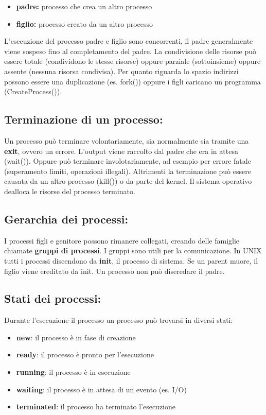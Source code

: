 \documentclass{article}
\begin{document}
\begin{itemize}
    \item \textbf{padre:} processo che crea un altro processo
    \item \textbf{figlio:} processo creato da un altro processo
\end{itemize}

L'esecuzione del processo padre e figlio sono concorrenti, il padre generalmente viene sospeso fino al completamento del padre. La 
condivisione delle risorse può essere totale (condividono le stesse risorse) oppure parziale (sottoinsieme) oppure assente (nessuna risorsa condivisa). Per quanto riguarda lo 
spazio indirizzi possono essere una duplicazione (es. fork()) oppure i figli caricano un programma (CreateProcess()).

\subsection{Terminazione di un processo:}
Un processo può terminare volontariamente, sia normalmente sia tramite una \textbf{exit}, ovvero un errore. L'output viene 
raccolto dal padre che era in attesa (wait()).
Oppure può terminare involotariamente, ad esempio per errore fatale (superamento limiti, operazioni illegali).
Altrimenti la terminazione può essere causata da un altro processo (kill()) o da parte del kernel. Il sistema operativo 
dealloca le risorse del processo terminato.

\subsection{Gerarchia dei processi:}
I processi figli e genitore possono rimanere collegati, creando delle famiglie chiamate \textbf{gruppi di processi}. I gruppi 
sono utili per la comunicazione.  
In UNIX tutti i processi discendono da \textbf{init}, il processo di sistema. Se un parent muore, il figlio viene ereditato da init. 
Un processo non può diseredare il padre.

\subsection{Stati dei processi:}
Durante l'esecuzione il processo un processo può trovarsi in diversi stati:
\begin{itemize}
    \item \textbf{new}: il processo è in fase di creazione
    \item \textbf{ready}: il processo è pronto per l'esecuzione
    \item \textbf{running}: il processo è in esecuzione
    \item \textbf{waiting}: il processo è in attesa di un evento (es. I/O)
    \item \textbf{terminated}: il processo ha terminato l'esecuzione
\end{itemize}
\end{document}
